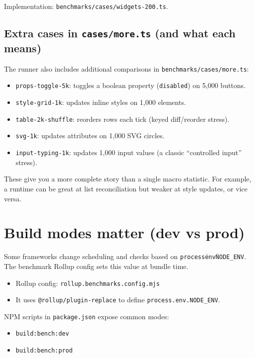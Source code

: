 Implementation: \texttt{benchmarks/cases/widgets-200.ts}.

\subsection{Extra cases in \texttt{cases/more.ts} (and what each means)}

The runner also includes additional comparisons in \texttt{benchmarks/cases/more.ts}:

\begin{itemize}
\item \texttt{props-toggle-5k}: toggles a boolean property (\texttt{disabled}) on 5,000 buttons.
\item \texttt{style-grid-1k}: updates inline styles on 1,000 elements.
\item \texttt{table-2k-shuffle}: reorders rows each tick (keyed diff/reorder stress).
\item \texttt{svg-1k}: updates attributes on 1,000 SVG circles.
\item \texttt{input-typing-1k}: updates 1,000 input values (a classic ``controlled input'' stress).
\end{itemize}

These give you a more complete story than a single macro statistic.
For example, a runtime can be great at list reconciliation but weaker at style updates, or vice versa.

\section{Build modes matter (dev vs prod)}

Some frameworks change scheduling and checks based on \texttt{process\.env\.NODE\_ENV}.
The benchmark Rollup config sets this value at bundle time.

\begin{itemize}
\item Rollup config: \texttt{rollup.benchmarks.config.mjs}
\item It uses \texttt{@rollup/plugin-replace} to define \texttt{process.env.NODE\_ENV}.
\end{itemize}

NPM scripts in \texttt{package.json} expose common modes:

\begin{itemize}
\item \texttt{build:bench:dev}
\item \texttt{build:bench:prod}
\end{itemize}

